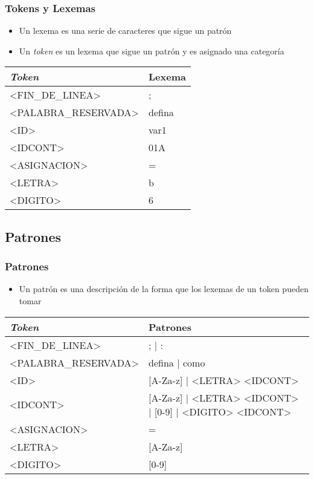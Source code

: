 \documentclass[14pt, aspectratio=169]{beamer}
\begin{document}
\begin{frame}
    \small
    \frametitle{Tokens y Lexemas}
    \begin{itemize}
        \item Un lexema es una serie de caracteres que sigue un patrón
        \item Un \textit{token} es un lexema que sigue un patrón y es asignado una categoría
    \end{itemize}
    \begin{tabularx}{\textwidth}{|X|X|}
        \hline
        \textit{Token}       & Lexema \\\hline
        <FIN\_DE\_LINEA>     & ;      \\\hline
        <PALABRA\_RESERVADA> & defina \\\hline
        <ID>                 & var1   \\\hline
        <IDCONT>             & 01A    \\\hline
        <ASIGNACION>         & =      \\\hline
        <LETRA>              & b      \\\hline
        <DIGITO>             & 6      \\\hline
    \end{tabularx}
\end{frame}

\subsection{Patrones}

\begin{frame}
    \frametitle{Patrones}
    \small
    \begin{itemize}
        \item Un patrón es una descripción de la forma que los lexemas de un token pueden tomar \cite{aho_compilers_1986}
    \end{itemize}
    \begin{tabularx}{\textwidth}{|X|X|}
        \hline
        \textit{Token}       & Patrones                                                \\\hline
        <FIN\_DE\_LINEA>     & ; | :                                                   \\\hline
        <PALABRA\_RESERVADA> & defina | como                                           \\\hline
        <ID>                 & [A-Za-z] | <LETRA> <IDCONT>                             \\\hline
        <IDCONT>             & [A-Za-z] | <LETRA> <IDCONT> | [0-9] | <DIGITO> <IDCONT> \\\hline
        <ASIGNACION>         & =                                                       \\\hline
        <LETRA>              & [A-Za-z]                                                \\\hline
        <DIGITO>             & [0-9]                                                   \\\hline
    \end{tabularx}
\end{frame}
\end{document}
